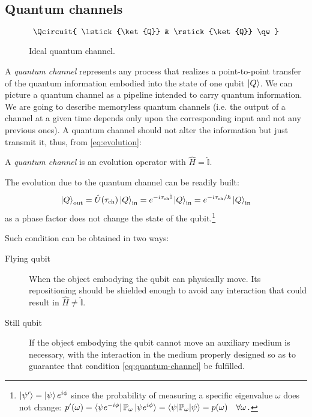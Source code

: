 \subsection{Quantum channels}
\begin{figure}[htb]
\[ \Qcircuit {
\lstick{\ket{Q}} & \rstick{\ket{Q}} \qw
}
\]
\caption{Ideal quantum channel.}
\label{fig:quantum-channel}
\end{figure}
A \emph{quantum channel} represents any process that realizes a point-to-point transfer of the quantum information embodied into the state of one qubit $\ket{Q}$. We can picture a quantum channel as a pipeline intended to carry quantum information. We are going to describe memoryless quantum channels (i.e. the output of a channel at a given time depends only upon the corresponding input and not any previous ones).
A quantum channel should not alter the information but just transmit it, thus, from \eqref{eq:evolution}:
\begin{defn}
A \emph{quantum channel} is an evolution operator with $\hat{H}=\hat{\mathbb{I}}$.
\end{defn}
The evolution due to the quantum channel can be readily built:
\begin{equation}\label{eq:quantum-channel}
    \ket{Q}_\textup{out} = \hat{U}(\tau_\textup{ch}) \ket{Q}_\textup{in} = e^{-i\tau_\textup{ch}\hat{\mathbb{I}}} \ket{Q}_\textup{in} = e^{-i\tau_\textup{ch}/\hbar} \ket{Q}_\textup{in}
\end{equation}
as a phase factor does not change the state of the qubit.\footnote{$\ket{\psi'}= \ket{\psi}e^{i\phi}$ since the probability of measuring a specific eigenvalue $\omega$ does not change: $p'(\omega) = \bra{\psi e^{-i\phi}}\mathbb{P}_\omega\ket{\psi e^{i\phi}} = \braket{\psi|\mathbb{P}_\omega|\psi} = p(\omega) \quad \forall \omega\,.$}

Such condition can be obtained in two ways:
\begin{description}
\item[Flying qubit] When the object embodying the qubit can physically move. Its repositioning should be shielded enough to avoid any interaction that could result in $\hat{H} \neq \hat{\mathbb{I}}$.
\item[Still qubit] If the object embodying the qubit cannot move an auxiliary medium is necessary, with the interaction in the medium properly designed so as to guarantee that condition \eqref{eq:quantum-channel} be fulfilled.
\end{description}

